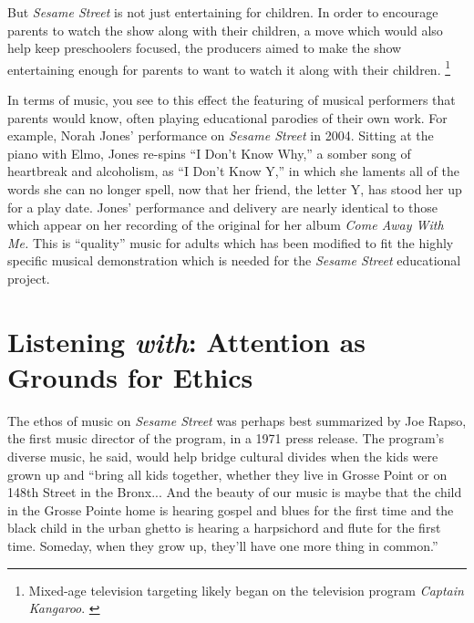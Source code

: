 \documentclass[12pt,letterpaper]{article}
\newcommand{\ses}{\textit{Sesame Street }}
\begin{document}
	But \textit{Sesame Street} is not just entertaining for children. 
	In order to encourage parents to watch the show along with their
	children, a move which would also help keep preschoolers focused,
	the producers aimed to make the show entertaining enough for parents
	to want to watch it along with their children.
	\autocite[294]{Ostrofsky2017}
	\footnote{Mixed-age television targeting likely began on the 
	television program \textit{Captain Kangaroo}. \autocite[46]{Davis}} 
	
	In terms of music, you see to this effect the featuring of musical 
	performers that parents would know, often playing educational parodies 
	of their own work. For example, Norah Jones' performance on \ses in 
	2004.\autocite{4081} Sitting at the piano with Elmo, Jones 
	re-spins ``I Don't Know Why,'' a somber song of heartbreak and 
	alcoholism, as ``I Don't Know Y,'' in which she laments all of the 
	words she can no longer spell, now that her friend, the letter Y, has 
	stood her up for a play date. Jones' performance and delivery are nearly
	identical to those which appear on her recording of the original for her
	album \textit{Come Away With Me.} This is ``quality'' music for adults
	which has been modified to fit the highly specific musical demonstration
	which is needed for the \ses educational project.
		

	\section*{Listening \textit{with}: Attention as Grounds for Ethics}	

	The ethos of music on \textit{Sesame Street} was perhaps best 
	summarized by Joe Rapso, the first music director of the program, in a
	1971 press release. The program's diverse music, he said, would
	help bridge cultural divides when the kids were grown up and ``bring all
	kids together, whether they live in Grosse Point or on 148th Street in 
	the Bronx... And the beauty of our music is maybe that the child in the
	Grosse Pointe home is hearing gospel and blues for the first time and 
	the black child in the urban ghetto is hearing a harpsichord and flute 
	for the first time. Someday, when they grow up, they'll have one more 
	thing in common.''\autocite[297]{Ostrofsky2012}
\end{document}
